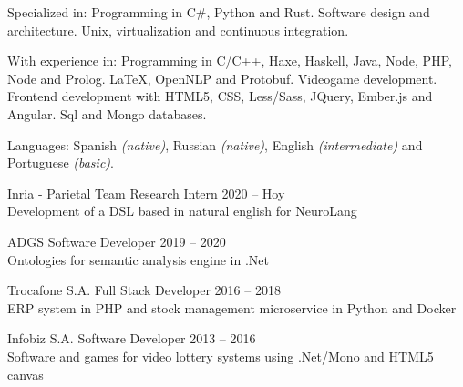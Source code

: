 \documentclass[10pt,a4paper]{article}
\begin{document}

\inlineheadsection
  { Specialized in: }
  { Programming in C\#, Python and Rust. Software design and architecture. Unix, virtualization and continuous integration.}

\inlineheadsection
  { With experience in: }
  { Programming in C/C++, Haxe, Haskell, Java, Node, PHP, Node and Prolog. \LaTeX, OpenNLP and Protobuf. Videogame development. Frontend development with HTML5, CSS, Less/Sass, JQuery, Ember.js and Angular. Sql and Mongo databases. }

  \vspace{0.5em}
\inlineheadsection
  { Languages: }
  { Spanish \emph{(native)}, Russian \emph{(native)}, English \emph{(intermediate)} and Portuguese \emph{(basic)}.}


\spacedhrule{1.9em}{-0.4em} %






\vspace{0.2em}
\headedsection
    { Inria - Parietal Team }
    { \textsc{} }{
    \headedsubsection
        { Research Intern }
        { 2020 -- Hoy }
        { \\ Development of a DSL based in natural english for NeuroLang \href{https://neurolang.github.io/}{\ExternalLink} }
}

\vspace{0.2em}
\headedsection
    { ADGS }
    { \textsc{} }{
    \headedsubsection
        { Software Developer }
        { 2019 -- 2020 }
        { \\ Ontologies for semantic analysis engine in .Net \href{http://www.tasmo.ai/}{\ExternalLink} }
}

\vspace{0.2em}
\headedsection
    { Trocafone S.A. }
    { \textsc{} }{
    \headedsubsection
        { Full Stack Developer }
        { 2016 -- 2018 }
        { \\ ERP system in PHP and stock management microservice in Python and Docker }
}

\vspace{0.2em}
\headedsection
    { Infobiz S.A. }
    { \textsc{} }{
    \headedsubsection
        { Software Developer }
        { 2013 -- 2016 }
        { \\ Software and games for video lottery systems using .Net/Mono and HTML5 canvas \href{http://www.infobiz.com.ar/english/ticket_games.php}{\ExternalLink} }
}
\end{document}
